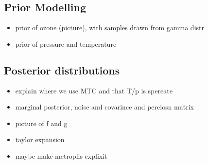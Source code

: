\subsection{Prior Modelling}
\begin{itemize}
	\item prior of ozone (picture), with samples drawn from gamma distr
	\item prior of pressure and temperature
\end{itemize}

\subsection{Posterior distributions}
\begin{itemize}
	\item explain where we use MTC and that T/p is spereate
	\item marginal posterior, noise and covarince and perciosn matrix
	\item picture of f and g
	\item taylor expansion
	\item maybe make  metroplis explixit
\end{itemize}


